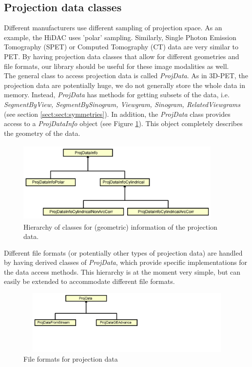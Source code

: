 \documentclass{article}
\begin{document}
\subsection{
Projection data classes}

Different manufacturers use different sampling of projection 
space. As an example, the HiDAC uses 'polar' sampling. Similarly, 
Single Photon Emission Tomography (SPET) or Computed Tomography 
(CT) data are very similar to PET. By having projection data 
classes that allow for different geometries and file formats, 
our library should be useful for these image modalities as well.\\
The general class to access projection data is called \textit{ProjData}. 
As in 3D-PET, the projection data are potentially huge, we do 
not generally store the whole data in memory. Instead, \textit{ProjData} 
has methods for getting subsets of the data, i.e. \textit{SegmentByView, 
SegmentBySinogram, Viewgram, Sinogram, RelatedViewgrams} (see section 
\ref{sect:sect:symmetries}). 
In addition, the \textit{ProjData} class provides access to a \textit{ProjDataInfo} 
object (see Figure \ref{projdatainfo-hierarchy}). This object completely describes the 
geometry of the data.

\begin{figure}[htbp]
\begin{center}
\includegraphics[width=4in, height=1.6in]{graphics/STIR-developers-overviewFig8}
\caption{ Hierarchy of classes for (geometric) information 
of the projection data.}
\label{projdatainfo-hierarchy}
\end{center}
\end{figure}


Different file formats (or potentially other types of projection 
data) are handled by having derived classes of \textit{ProjData}, 
which provide specific implementations for the data access methods. 
This hierarchy is at the moment very simple, but can easily be 
extended to accommodate different file formats.

\begin{figure}[htbp]
\begin{center}
\includegraphics[width=5.103in, height=1.251in]{graphics/STIR-developers-overviewFig9}
\caption{ File formats for projection data}
\end{center}
\end{figure}
\end{document}
